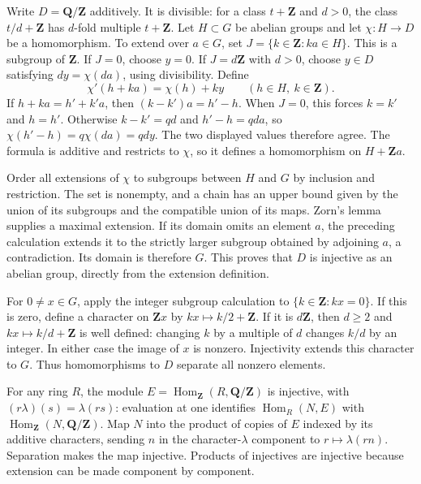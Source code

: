 \documentclass[11pt,a4paper,openany]{report}
\newcounter{none}
\begin{document}
Write \(D=\mathbf Q/\mathbf Z\) additively. It is divisible: for a class \(t+\mathbf Z\) and \(d>0\), the class \(t/d+\mathbf Z\) has \(d\)-fold multiple \(t+\mathbf Z\). Let \(H\subset G\) be abelian groups and let \(\chi:H\to D\) be a homomorphism. To extend over \(a\in G\), set \(J=\{k\in\mathbf Z:ka\in H\}\). This is a subgroup of \(\mathbf Z\). If \(J=0\), choose \(y=0\). If \(J=d\mathbf Z\) with \(d>0\), choose \(y\in D\) satisfying \(dy=\chi(da)\), using divisibility. Define \[
\chi'(h+ka)=\chi(h)+ky\qquad(h\in H,\ k\in\mathbf Z).
\] If \(h+ka=h'+k'a\), then \((k-k')a=h'-h\). When \(J=0\), this forces \(k=k'\) and \(h=h'\). Otherwise \(k-k'=qd\) and \(h'-h=qda\), so \(\chi(h'-h)=q\chi(da)=qdy\). The two displayed values therefore agree. The formula is additive and restricts to \(\chi\), so it defines a homomorphism on \(H+\mathbf Za\).

Order all extensions of \(\chi\) to subgroups between \(H\) and \(G\) by inclusion and restriction. The set is nonempty, and a chain has an upper bound given by the union of its subgroups and the compatible union of its maps. Zorn's lemma supplies a maximal extension. If its domain omits an element \(a\), the preceding calculation extends it to the strictly larger subgroup obtained by adjoining \(a\), a contradiction. Its domain is therefore \(G\). This proves that \(D\) is injective as an abelian group, directly from the extension definition.

For \(0\ne x\in G\), apply the integer subgroup calculation to \(\{k\in\mathbf Z:kx=0\}\). If this is zero, define a character on \(\mathbf Zx\) by \(kx\mapsto k/2+\mathbf Z\). If it is \(d\mathbf Z\), then \(d\ge2\) and \(kx\mapsto k/d+\mathbf Z\) is well defined: changing \(k\) by a multiple of \(d\) changes \(k/d\) by an integer. In either case the image of \(x\) is nonzero. Injectivity extends this character to \(G\). Thus homomorphisms to \(D\) separate all nonzero elements.

For any ring \(R\), the module \(E=\operatorname{Hom}_{\mathbf Z}(R,\mathbf Q/\mathbf Z)\) is injective, with \((r\lambda)(s)=\lambda(rs)\): evaluation at one identifies \(\operatorname{Hom}_R(N,E)\) with \(\operatorname{Hom}_{\mathbf Z}(N,\mathbf Q/\mathbf Z)\). Map \(N\) into the product of copies of \(E\) indexed by its additive characters, sending \(n\) in the character-\(\lambda\) component to \(r\mapsto\lambda(rn)\). Separation makes the map injective. Products of injectives are injective because extension can be made component by component.
\end{document}
